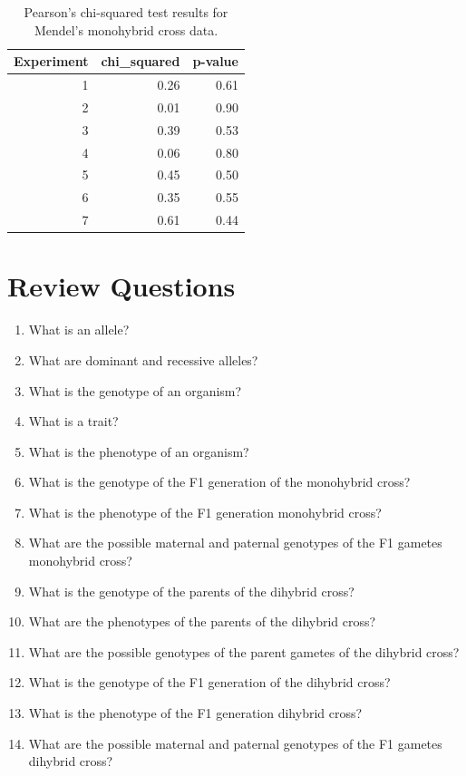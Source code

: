 \documentclass[]{book}
\providecommand{\tightlist}{%
  \setlength{\itemsep}{0pt}\setlength{\parskip}{0pt}}
\theoremstyle{definition}
\theoremstyle{definition}
\theoremstyle{definition}
\theoremstyle{remark}
\begin{document}
\begin{table}

\caption{\label{tab:mendelchisq}Pearson's chi-squared test results for Mendel's monohybrid cross data.}
\centering
\begin{tabular}[t]{r|r|r}
\hline
Experiment & chi\_squared & p-value\\
\hline
1 & 0.26 & 0.61\\
\hline
2 & 0.01 & 0.90\\
\hline
3 & 0.39 & 0.53\\
\hline
4 & 0.06 & 0.80\\
\hline
5 & 0.45 & 0.50\\
\hline
6 & 0.35 & 0.55\\
\hline
7 & 0.61 & 0.44\\
\hline
\end{tabular}
\end{table}

\section{Review Questions}\label{review-questions-3}

\begin{enumerate}
\def\labelenumi{\arabic{enumi}.}
\setcounter{enumi}{1}
\tightlist
\item
  What is an allele?
\item
  What are dominant and recessive alleles?
\item
  What is the genotype of an organism?
\item
  What is a trait?
\item
  What is the phenotype of an organism?
\item
  What is the genotype of the F1 generation of the monohybrid cross?
\item
  What is the phenotype of the F1 generation monohybrid cross?
\item
  What are the possible maternal and paternal genotypes of the F1
  gametes monohybrid cross?
\item
  What is the genotype of the parents of the dihybrid cross?
\item
  What are the phenotypes of the parents of the dihybrid cross?
\item
  What are the possible genotypes of the parent gametes of the dihybrid
  cross?
\item
  What is the genotype of the F1 generation of the dihybrid cross?
\item
  What is the phenotype of the F1 generation dihybrid cross?
\item
  What are the possible maternal and paternal genotypes of the F1
  gametes dihybrid cross?
\end{enumerate}
\end{document}
